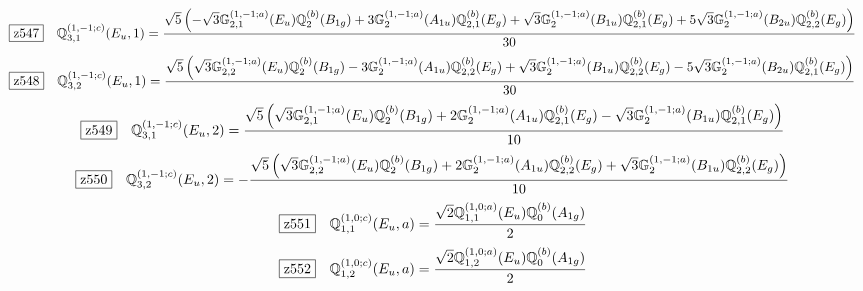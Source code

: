 \documentclass[fleqn,10pt,landscape]{jsarticle}
\begin{document}
\begin{dmath*}
\hspace*{3mm}\fbox{z547}\quad \mathbb{Q}_{3,1}^{(1,-1;c)}(E_{u},1)=\frac{\sqrt{5} \left(- \sqrt{3} \mathbb{G}_{2,1}^{(1,-1;a)}(E_{u}) \mathbb{Q}_{2}^{(b)}(B_{1g}) + 3 \mathbb{G}_{2}^{(1,-1;a)}(A_{1u}) \mathbb{Q}_{2,1}^{(b)}(E_{g}) + \sqrt{3} \mathbb{G}_{2}^{(1,-1;a)}(B_{1u}) \mathbb{Q}_{2,1}^{(b)}(E_{g}) + 5 \sqrt{3} \mathbb{G}_{2}^{(1,-1;a)}(B_{2u}) \mathbb{Q}_{2,2}^{(b)}(E_{g})\right)}{30}
\end{dmath*}
\begin{dmath*}
\hspace*{3mm}\fbox{z548}\quad \mathbb{Q}_{3,2}^{(1,-1;c)}(E_{u},1)=\frac{\sqrt{5} \left(\sqrt{3} \mathbb{G}_{2,2}^{(1,-1;a)}(E_{u}) \mathbb{Q}_{2}^{(b)}(B_{1g}) - 3 \mathbb{G}_{2}^{(1,-1;a)}(A_{1u}) \mathbb{Q}_{2,2}^{(b)}(E_{g}) + \sqrt{3} \mathbb{G}_{2}^{(1,-1;a)}(B_{1u}) \mathbb{Q}_{2,2}^{(b)}(E_{g}) - 5 \sqrt{3} \mathbb{G}_{2}^{(1,-1;a)}(B_{2u}) \mathbb{Q}_{2,1}^{(b)}(E_{g})\right)}{30}
\end{dmath*}
\begin{dmath*}
\hspace*{3mm}\fbox{z549}\quad \mathbb{Q}_{3,1}^{(1,-1;c)}(E_{u},2)=\frac{\sqrt{5} \left(\sqrt{3} \mathbb{G}_{2,1}^{(1,-1;a)}(E_{u}) \mathbb{Q}_{2}^{(b)}(B_{1g}) + 2 \mathbb{G}_{2}^{(1,-1;a)}(A_{1u}) \mathbb{Q}_{2,1}^{(b)}(E_{g}) - \sqrt{3} \mathbb{G}_{2}^{(1,-1;a)}(B_{1u}) \mathbb{Q}_{2,1}^{(b)}(E_{g})\right)}{10}
\end{dmath*}
\begin{dmath*}
\hspace*{3mm}\fbox{z550}\quad \mathbb{Q}_{3,2}^{(1,-1;c)}(E_{u},2)=- \frac{\sqrt{5} \left(\sqrt{3} \mathbb{G}_{2,2}^{(1,-1;a)}(E_{u}) \mathbb{Q}_{2}^{(b)}(B_{1g}) + 2 \mathbb{G}_{2}^{(1,-1;a)}(A_{1u}) \mathbb{Q}_{2,2}^{(b)}(E_{g}) + \sqrt{3} \mathbb{G}_{2}^{(1,-1;a)}(B_{1u}) \mathbb{Q}_{2,2}^{(b)}(E_{g})\right)}{10}
\end{dmath*}
\begin{dmath*}
\hspace*{3mm}\fbox{z551}\quad \mathbb{Q}_{1,1}^{(1,0;c)}(E_{u},a)=\frac{\sqrt{2} \mathbb{Q}_{1,1}^{(1,0;a)}(E_{u}) \mathbb{Q}_{0}^{(b)}(A_{1g})}{2}
\end{dmath*}
\begin{dmath*}
\hspace*{3mm}\fbox{z552}\quad \mathbb{Q}_{1,2}^{(1,0;c)}(E_{u},a)=\frac{\sqrt{2} \mathbb{Q}_{1,2}^{(1,0;a)}(E_{u}) \mathbb{Q}_{0}^{(b)}(A_{1g})}{2}
\end{dmath*}
\end{document}
